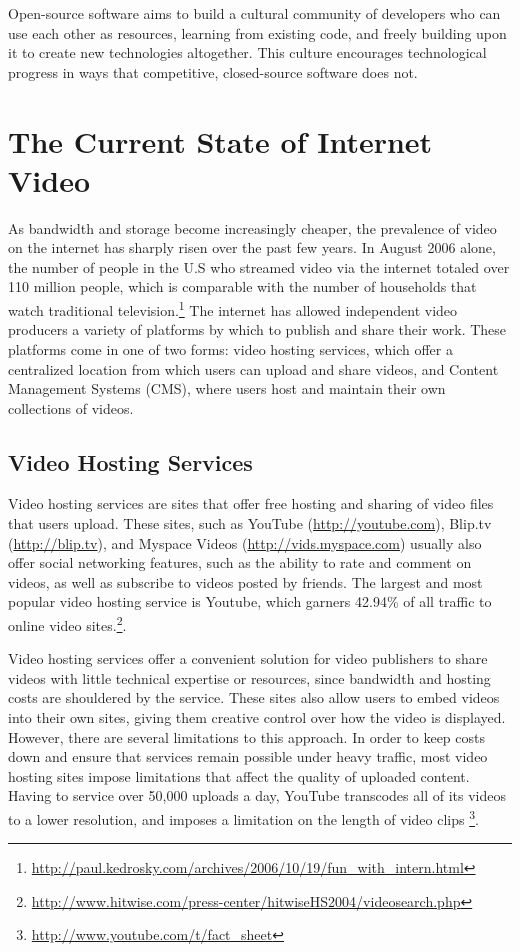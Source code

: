 \documentclass[a4paper,12pt]{report}
\begin{document}
Open-source software aims to build a cultural community of developers who can use each other as resources, learning from existing code, and freely building upon it to create new technologies altogether.
This culture encourages technological progress in ways that competitive, closed-source software does not. 

\section{The Current State of Internet Video}
As bandwidth and storage become increasingly cheaper, the prevalence of video on the internet has sharply risen over the past few years. 
In August 2006 alone, the number of people in the U.S who streamed video 
via the internet totaled over 110 million people, which is comparable 
with the number of households that watch traditional television.\footnote{\url{http://paul.kedrosky.com/archives/2006/10/19/fun\_with\_intern.html}}
The internet has allowed independent video producers a variety of platforms by which to publish and share their work. These platforms come in one of two forms: video hosting services, which offer a centralized location from which users can upload and share videos, and Content Management Systems (CMS), where users host and maintain their own collections of videos.

\subsection{Video Hosting Services}
Video hosting services are sites that offer free hosting and sharing of video files that users upload.
These sites, such as YouTube (\url{http://youtube.com}), Blip.tv (\url{http://blip.tv}), and Myspace Videos (\url{http://vids.myspace.com}) usually also offer social networking features, such as the ability to rate and comment on videos, as well as subscribe to videos posted by friends.
The largest and most popular video hosting service is Youtube, which garners 42.94\% of all traffic to online video sites.\footnote{\url{http://www.hitwise.com/press-center/hitwiseHS2004/videosearch.php}}. 

Video hosting services offer a convenient solution for video publishers 
to share videos with little technical expertise or resources, since bandwidth and hosting costs are shouldered by the service. These sites also allow users to embed videos into their own sites, giving them creative control over how the video is displayed. However, there are several limitations to this approach. In order to keep costs down and ensure that services remain possible under heavy traffic, most video hosting sites impose limitations that affect the quality of uploaded content. Having to service over 50,000 uploads a day, YouTube transcodes all of its videos to a lower resolution, and imposes a limitation on the length of video clips \footnote{\url{http://www.youtube.com/t/fact\_sheet}}. 
\end{document}
